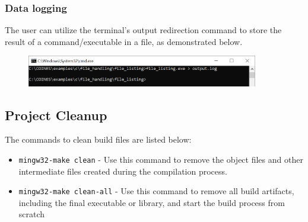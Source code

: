 \documentclass{article}
\begin{document}
\subsubsection{Data logging}

The user can utilize the terminal's output redirection command to store the result of a command/executable in a file, as demonstrated below.
\begin{figure}[H]
	\begin{center}
		\includegraphics[width=0.9\textwidth]{coinesAPI_images/PC_data_logging.png}
	\end{center}
\end{figure}

\subsection{Project Cleanup}
The commands to clean build files are listed below:
\begin{itemize}
	\item \texttt{mingw32-make clean} - Use this command to remove the object files and other intermediate files created during the compilation process.
	\item \texttt{mingw32-make clean-all} - Use this command to remove all build artifacts, including the final executable or library, and start the build process from scratch
\end{itemize}
\end{document}
